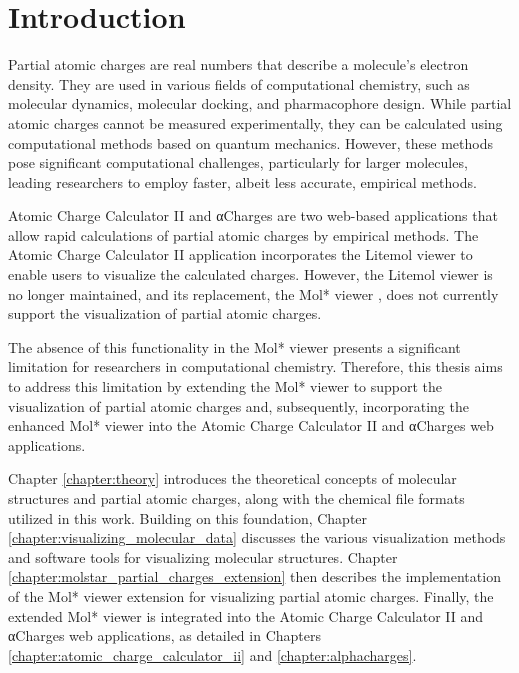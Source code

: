 \documentclass[
  digital,     %
  oneside,     %
  nosansbold,  %
  nocolorbold, %
  lof,         %
  lot,         %
]{fithesis4}
\begin{document}
\clearpage
\newpage

\chapter*{Introduction}
\label{chap:introduction}

Partial atomic charges are real numbers that describe a molecule's electron density. They are used in various fields of computational chemistry, such as molecular dynamics, molecular docking, and pharmacophore design. \cite{racek2022thesis} While partial atomic charges cannot be measured experimentally, they can be calculated using computational methods based on quantum mechanics. \cite{gupta2015principles} However, these methods pose significant computational challenges, particularly for larger molecules, leading researchers to employ faster, albeit less accurate, empirical methods. \cite{schindler2019thesis}

Atomic Charge Calculator II \cite{racek2020acc2} and αCharges \cite{schindler2023alphacharges} are two web-based applications that allow rapid calculations of partial atomic charges by empirical methods. The Atomic Charge Calculator II application incorporates the Litemol viewer \cite{sehnal2017litemol} to enable users to visualize the calculated charges. However, the Litemol viewer is no longer maintained, and its replacement, the Mol* viewer \cite{sehnal2021molstar}, does not currently support the visualization of partial atomic charges.

The absence of this functionality in the Mol* viewer presents a significant limitation for researchers in computational chemistry. Therefore, this thesis aims to address this limitation by extending the Mol* viewer to support the visualization of partial atomic charges and, subsequently, incorporating the enhanced Mol* viewer into the Atomic Charge Calculator II and αCharges web applications.

Chapter \ref{chapter:theory} introduces the theoretical concepts of molecular structures and partial atomic charges, along with the chemical file formats utilized in this work. Building on this foundation, Chapter \ref{chapter:visualizing_molecular_data} discusses the various visualization methods and software tools for visualizing molecular structures. Chapter \ref{chapter:molstar_partial_charges_extension} then describes the implementation of the Mol* viewer extension for visualizing partial atomic charges. Finally, the extended Mol* viewer is integrated into the Atomic Charge Calculator II and αCharges web applications, as detailed in Chapters \ref{chapter:atomic_charge_calculator_ii} and \ref{chapter:alphacharges}.
\end{document}
